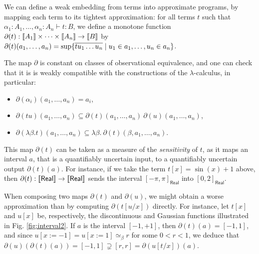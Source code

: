 We can define a weak embedding from terms into approximate programs, by mapping each term to its tightest approximation: for all terms $t$ such that $\alpha_{1}:A_{1},\dots,\alpha_{n}:A_{n}\vdash t:B$, we define a monotone function $\partial(t):\llbracket A_{1} \rrbracket\times \dots \times \llbracket A_{n} \rrbracket \to \llbracket B \rrbracket$ by $\partial(t)(a_1, \ldots, a_n) = \sup \{ \overline{t u_1 \ldots u_n} \mid u_1 \in a_1, \ldots, u_n \in a_n \}$. 

\begin{remark} \label{remark:push-exp-stlc}
The map $\partial$ is constant on classes of observational equivalence, and one can check that it is is weakly compatible with the constructions of the $\lambda$-calculus, in particular:
\begin{itemize}
\item $\partial (\alpha_{i})(a_{1},\dots, a_{n})=a_{i}$,
\item $\partial (tu)(a_{1},\dots, a_{n}) \subseteq \partial (t)(a_{1},\dots, a_{n}) ~ \partial (u)(a_{1},\dots, a_{n})$,
\item $\partial (\lambda \beta. t)(a_{1},\dots, a_{n}) \subseteq \lambda \beta.~ \partial (t)(\beta, a_{1},\dots, a_{n})$.
\end{itemize}
\end{remark}

This map $\partial(t)$ can be taken as a measure of the \emph{sensitivity} of $t$, as it maps an interval $a$, that is a quantifiably uncertain input, to a quantifiably uncertain output $\partial(t)(a)$. 
For instance, if we take the term $t[x]= \sin(x)+1$ above, then $\partial(t): \llbracket \mathsf{Real} \rrbracket\to \llbracket \mathsf{Real} \rrbracket$ sends the interval $[-\pi,\pi]_{\mathsf{Real}}$ into $[0,2]_{\mathsf{Real}}$.



\begin{remark} \label{remark:oplax-functor-stlc}
When composing two maps $\partial(t)$ and $\partial(u)$, we might obtain a worse approximation than by computing $\partial(t[u/x])$ directly.
For instance, let $t[x]$ and 
$u[x]$ be, respectively, the discontinuous and Gaussian functions illustrated in Fig. \ref{fig:interval2}.  
If $a$ is the interval $[-1,+1]$, then $\partial(t)(a)=[-1,1]$, and since $u[x:=-1]=u[x:=1]\simeq_{\beta} r$ for some $0<r<1$, we deduce that $\partial(u)(\partial(t)(a))=[-1,1] \supsetneq [r,r  ]= \partial (u[t/x])(a)$.

\end{remark}










